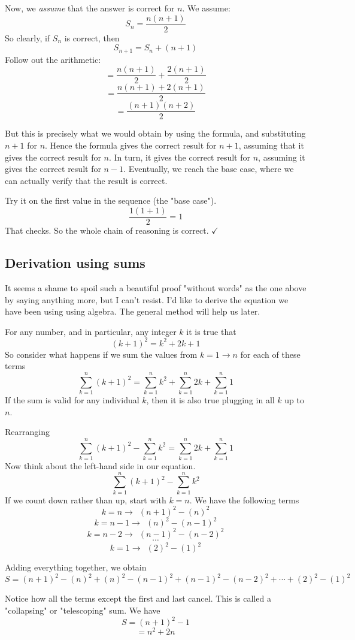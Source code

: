 \documentclass[11pt, oneside]{article}   	%
\begin{document}
Now, we \emph{assume} that the answer is correct for $n$.  We assume:
\[ S_n = \frac{n(n+1)}{2} \]
So clearly, if $S_n$ is correct, then
\[ S_{n+1} = S_n + (n + 1) \]
Follow out the arithmetic:
\[ = \frac{n(n+1)}{2} + \frac{2(n+1)}{2} \]
\[ = \frac{n(n+1) + 2(n+1)}{2} \]
\[ = \frac{(n+1)(n+2)}{2} \]

But this is precisely what we would obtain by using the formula, and substituting $n+1$ for $n$.  Hence the formula gives the correct result for $n+1$, assuming that it gives the correct result for $n$.  In turn, it gives the correct result for $n$, assuming it gives the correct result for $n-1$.  Eventually, we reach the base case, where we can actually verify that the result is correct.

Try it on the first value in the sequence (the "base case").
\[ \frac{1(1+1)}{2} = 1 \]
That checks.  So the whole chain of reasoning is correct.  $\checkmark$

\subsection*{Derivation using sums}
It seems a shame to spoil such a beautiful proof "without words" as the one above by saying anything more, but I can't resist.  I'd like to derive the equation we have been using using algebra.  The general method will help us later.

For any number, and in particular, any integer $k$ it is true that
\[ (k+1)^2 = k^2 + 2k + 1 \]
So consider what happens if we sum the values from $k=1 \rightarrow n$ for each of these terms
\[ \sum_{k=1}^n (k+1)^2 = \sum_{k=1}^n k^2 + \sum_{k=1}^n 2k + \sum_{k=1}^n 1 \]
If the sum is valid for any individual $k$, then it is also true plugging in all $k$ up to $n$.

Rearranging
\[ \sum_{k=1}^n (k+1)^2 - \sum_{k=1}^n k^2 = \sum_{k=1}^n 2k + \sum_{k=1}^n 1 \]
Now think about the left-hand side in our equation. 
\[ \sum_{k=1}^n (k+1)^2 - \sum_{k=1}^n k^2 \]
If we count down rather than up, start with $k=n$.  We have the following terms
\[ k = n \rightarrow \ \ (n+1)^2 - (n)^2 \]
\[ k = n-1 \rightarrow \ \ (n)^2 - (n-1)^2 \]
\[ k = n-2 \rightarrow \ \ (n-1)^2 - (n-2)^2 \]
\[ \cdots \]
\[ k = 1 \rightarrow \ \ (2)^2 - (1)^2 \]

Adding everything together, we obtain
\[ S = (n+1)^2 - (n)^2 + (n)^2 - (n-1)^2 + (n-1)^2 - (n-2)^2 + \cdots + (2)^2 - (1)^2 \]

Notice how all the terms except the first and last cancel.  This is called a "collapsing" or "telescoping" sum.  We have
\[ S = (n+1)^2 - 1 \]
\[ = n^2 + 2n \]
\end{document}
